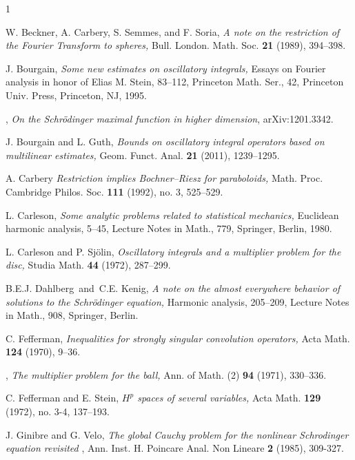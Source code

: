 \documentclass[11pt]{amsart}
\theoremstyle{definition}
\numberwithin{theorem}{section}
\numberwithin{definition}{section}
\numberwithin{equation}{section}
\def\emph#1{{\it #1 }}
\begin{document}
\begin{thebibliography}{1}


 W. Beckner, A. Carbery, S. Semmes, and F. Soria,
\emph{A note on the restriction of the Fourier Transform to
spheres,} Bull. London. Math. Soc. {\bf 21} (1989), 394--398.

 J. Bourgain, \emph{Some new estimates on oscillatory
integrals,} Essays on Fourier analysis in honor of Elias M. Stein, 83–112,
Princeton Math. Ser., 42, Princeton Univ. Press, Princeton, NJ, 1995.

  \bysame, {\it On the   Schr\"odinger maximal function in higher dimension},  arXiv:1201.3342.

 J. Bourgain and L. Guth, \emph{Bounds on oscillatory integral operators based on multilinear estimates,} Geom. Funct. Anal. {\bf 21} (2011), 1239--1295.

 A. Carbery
\emph{Restriction implies Bochner--Riesz for paraboloids,} Math. Proc.
 Cambridge Philos. Soc. {\bf 111} (1992), no. 3, 525--529.

 L. Carleson, \emph{Some analytic problems related to statistical mechanics,}  Euclidean harmonic analysis,   5--45, Lecture Notes in Math., {779}, Springer, Berlin, 1980.



 L. Carleson and P. Sj\"olin,
   \emph{Oscillatory integrals and a multiplier problem for the disc,}
   Studia Math. {\bf 44} (1972), 287--299.

 B.E.J. Dahlberg\ and\ C.E. Kenig, \emph{A note on the almost everywhere behavior of solutions to the Schr\"odinger equation,}  Harmonic analysis, 205--209, Lecture Notes in Math., {908}, Springer, Berlin.

 C. Fefferman, \emph{Inequalities for strongly singular convolution operators,} Acta Math. {\bf  124}  (1970),  9--36.

 \bysame,
\emph{The multiplier problem for the ball,} Ann. of Math. (2) {\bf 94} (1971), 330--336.


 C. Fefferman and E. Stein,  \emph{$H^p$ spaces of several variables,}
Acta Math.  {\bf 129}  (1972), no. 3-4, 137--193.


  J. Ginibre and G. Velo, \emph{The global Cauchy problem for the nonlinear Schrodinger equation revisited},     Ann. Inst. H. Poincare Anal. Non Lineare {\bf 2} (1985), 309-327.



\end{thebibliography}
\end{document}
